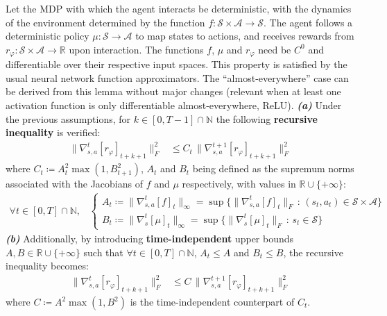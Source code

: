 \begin{lemma}
\label{lemma}
Let the MDP with which the agent interacts be deterministic,
with the dynamics of the environment determined
by the function $f: \mathcal{S} \times \mathcal{A} \rightarrow \mathcal{S}$.
The agent follows a deterministic policy $\mu: \mathcal{S} \rightarrow \mathcal{A}$
to map states to actions,
and receives rewards from
$r_\varphi: \mathcal{S} \times \mathcal{A} \rightarrow \mathbb{R}$
upon interaction.
The functions $f$, $\mu$ and $r_\varphi$ need be $C^0$ and differentiable
over their respective input spaces.
This property is satisfied by the usual neural network function approximators.
The ``almost-everywhere'' case can be derived from this lemma without major changes
(relevant when at least one activation function is only differentiable almost-everywhere, ReLU).
\textbf{\emph{(a)}} Under the previous assumptions,
for $k \in [0, T-1] \cap \mathbb{N}$ the following \textbf{recursive inequality} is verified:
\begin{align}
\lVert \nabla_{s,a}^t[r_\varphi]_{t+k+1} \rVert ^2_F
&\leq
C_t
\, \lVert \nabla_{s,a}^{t+1}[r_\varphi]_{t+k+1} \rVert ^2_F
\end{align}
where $C_t \coloneqq A_t^2 \max(1, B_{t+1}^2)$,
$A_t$ and $B_t$ being defined as the supremum norms associated with the Jacobians of $f$
and $\mu$ respectively, with values in $\mathbb{R} \cup \{+\infty\}$:
\begin{align}
\forall t \in [0, T] \cap \mathbb{N} \text{,} \quad
\begin{cases}
A_t \coloneqq \lVert\nabla_{s,a}^t[f]_t\rVert _\infty
= \sup \big\{\lVert\nabla_{s,a}^t[f]_t\rVert _F \, : \, (s_t, a_t) \in
\mathcal{S} \times \mathcal{A} \big\} \\
B_t \coloneqq \lVert\nabla_s^t[\mu]_t\rVert _\infty
= \sup \big\{\lVert\nabla_s^t[\mu]_t\rVert _F \, : \, s_t \in
\mathcal{S} \big\}
\end{cases}
\end{align}
\textbf{\emph{(b)}} Additionally, by introducing \textbf{time-independent} upper bounds
$A, B \in \mathbb{R} \cup \{+\infty\}$
such that $\forall t \in [0, T] \cap \mathbb{N}$,
$A_t \leq A$ and $B_t \leq B$, the recursive inequality becomes:
\begin{align}
\lVert \nabla_{s,a}^t[r_\varphi]_{t+k+1} \rVert ^2_F
&\leq
C
\, \lVert \nabla_{s,a}^{t+1}[r_\varphi]_{t+k+1} \rVert ^2_F
\end{align}
where $C \coloneqq A^2 \max(1, B^2)$ is the time-independent counterpart of $C_t$.
\end{lemma}

